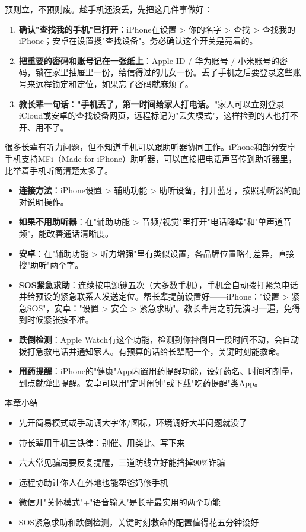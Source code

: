 
预则立，不预则废。趁手机还没丢，先把这几件事做好：

\begin{enumerate}
  \item \textbf{确认"查找我的手机"已打开}：iPhone在设置 > 你的名字 > 查找 > 查找我的iPhone；安卓在设置搜"查找设备"。务必确认这个开关是亮着的。
  \item \textbf{把重要的密码和账号记在一张纸上}：Apple ID / 华为账号 / 小米账号的密码，锁在家里抽屉里一份，给信得过的儿女一份。丢了手机之后要登录这些账号来远程锁定和定位，如果忘了密码就麻烦了。
  \item \textbf{教长辈一句话}：\textbf{"手机丢了，第一时间给家人打电话。"}家人可以立刻登录iCloud或安卓的查找设备网页，远程标记为"丢失模式"，这样捡到的人也打不开、用不了。
\end{enumerate}


很多长辈有听力问题，但不知道手机可以跟助听器协同工作。iPhone和部分安卓手机支持MFi（Made for iPhone）助听器，可以直接把电话声音传到助听器里，比举着手机听筒清楚太多了。

\begin{itemize}
  \item \textbf{连接方法}：iPhone设置 > 辅助功能 > 助听设备，打开蓝牙，按照助听器的配对说明操作。
  \item \textbf{如果不用助听器}：在"辅助功能 > 音频/视觉"里打开"电话降噪"和"单声道音频"，能改善通话清晰度。
  \item \textbf{安卓}：在"辅助功能 > 听力增强"里有类似设置，各品牌位置略有差异，直接搜"助听"两个字。
\end{itemize}


\begin{itemize}
  \item \textbf{SOS紧急求助}：连续按电源键五次（大多数手机），手机会自动拨打紧急电话并给预设的紧急联系人发送定位。帮长辈提前设置好——iPhone："设置 > 紧急SOS"，安卓："设置 > 安全 > 紧急求助"。教长辈用之前先演习一遍，免得到时候紧张按不准。
  \item \textbf{跌倒检测}：Apple Watch有这个功能，检测到你摔倒且一段时间不动，会自动拨打急救电话并通知家人。有预算的话给长辈配一个，关键时刻能救命。
  \item \textbf{用药提醒}：iPhone的"健康"App内置用药提醒功能，设好药名、时间和剂量，到点就弹出提醒。安卓可以用"定时闹钟"或下载"吃药提醒"类App。
\end{itemize}

\begin{tcbsummary}{本章小结}
\begin{itemize}
  \item 先开简易模式或手动调大字体/图标，环境调好大半问题就没了
  \item 带长辈用手机三铁律：别催、用类比、写下来
  \item 六大常见骗局要反复提醒，三道防线立好能挡掉90\%诈骗
  \item 远程协助让你人在外地也能帮爸妈修手机
  \item 微信开"关怀模式"+"语音输入"是长辈最实用的两个功能
  \item SOS紧急求助和跌倒检测，关键时刻救命的配置值得花五分钟设好
\end{itemize}

\end{tcbsummary}
